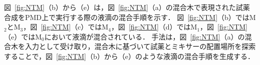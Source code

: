 
図~\ref{fig:NTM}（b）から（e）は，図~\ref{fig:NTM}（a）の混合木で表現された試薬合成をPMD上で実行する際の液滴の混合手順を示す．
図~\ref{fig:NTM}（b）ではM$_2$とM$_3$，図~\ref{fig:NTM}（c）ではM$_4$，図~\ref{fig:NTM}（d）ではM$_1$，図~\ref{fig:NTM}（e）ではM$_0$において液滴が混合されている．
手法は，図~\ref{fig:NTM}（a）の混合木を入力として受け取り，混合木に基づいて試薬とミキサーの配置場所を探索することで，図~\ref{fig:NTM}（b）から（e）のような液滴の混合手順を生成する．

